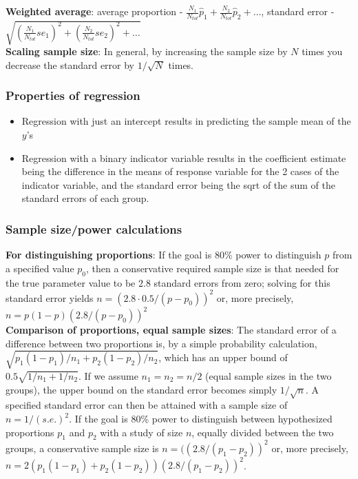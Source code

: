 \documentclass{article}
\begin{document}
\textbf{Weighted average}: average proportion - $\frac{N_1}{N_{tot}}\hat{p}_1 + \frac{N_2}{N_{tot}}\hat{p}_2 + \ldots$, standard error - $\sqrt{(\frac{N_1}{N_{tot}} se_1)^2 + (\frac{N_2}{N_{tot}}se_2)^2 + \ldots}$\\

\textbf{Scaling sample size}: In general, by increasing the sample size by $N$ times you decrease the standard error by $1/\sqrt{N}$ times.

\subsubsection{Properties of regression}
\begin{itemize}
\item Regression with just an intercept results in predicting the sample mean of the $y$'s
\item Regression with a binary indicator variable results in the coefficient estimate being the difference in the means of response variable for the 2 cases of the indicator variable, and the
  standard error being the sqrt of the sum of the standard errors of each group.
\end{itemize}

\subsubsection{Sample size/power calculations}
\textbf{For distinguishing proportions}: If the goal is 80\% power to distinguish $p$ from a specified value $p_0$, then a conservative required sample size is that
needed for the true parameter value to be 2.8 standard errors from zero; solving for this standard error
yields $n = (2.8 \cdot 0.5/(p - p_0))^2$ or, more precisely, $n = p(1 - p)(2.8/(p - p_0))^2$\\

\textbf{Comparison of proportions, equal sample sizes}: The standard error of a difference between two proportions is, by a simple probability calculation, $\sqrt{p_1 (1 - p_1)/n_1 + p_2 (1 - p_2)/n_2}$, which has an upper bound of $0.5\sqrt{ 1/n_1 + 1/n_2}$. If we assume
$n_1 = n_2 = n/2$ (equal sample sizes in the two groups), the upper bound on the standard error becomes
simply $1/\sqrt{n}$. A specified standard error can then be attained with a sample size of $n = 1/(s.e.)^2$. If
the goal is 80\% power to distinguish between hypothesized proportions $p_1$ and $p_2$ with a study of size
$n$, equally divided between the two groups, a conservative sample size is $n = ((2.8/(p_1 - p_2))^2$ or,
more precisely, $n = 2(p_1 (1 - p_1) + p_2 (1 - p_2))(2.8/(p_1 - p_2))^2$. \\
\end{document}
